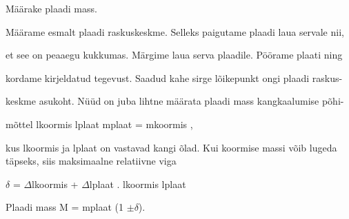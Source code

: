
Määrake plaadi mass.

\hint

\solu
Määrame esmalt plaadi raskuskeskme. Selleks paigutame plaadi laua servale nii,

et see on peaaegu kukkumas. Märgime laua serva plaadile. Pöörame plaati ning

kordame kirjeldatud tegevust. Saadud kahe sirge lõikepunkt ongi plaadi raskus-

keskme asukoht. Nüüd on juba lihtne määrata plaadi mass kangkaalumise põhi-

mõttel lkoormis lplaat mplaat = mkoormis ,

kus lkoormis ja lplaat on vastavad kangi õlad. Kui koormise massi võib lugeda täpseks, siis maksimaalne relatiivne viga

$\delta$ = $\Delta$lkoormis + $\Delta$lplaat . lkoormis lplaat

Plaadi mass M = mplaat (1 $\pm \delta$).
\probend
